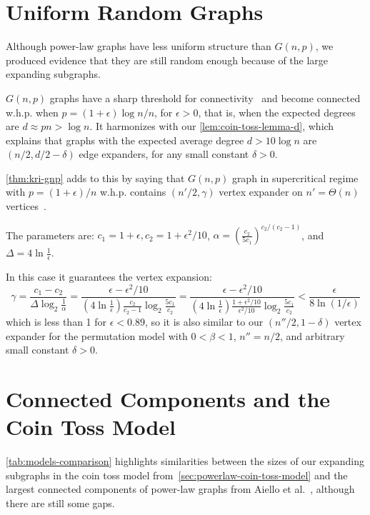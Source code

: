 \section{Uniform Random Graphs}

Although power-law graphs have less uniform structure than $G(n,p)$,
we produced evidence that they are still random enough because of
the large expanding subgraphs.

$G(n,p)$ graphs have a sharp threshold for connectivity~\cite{er59} and
become connected w.h.p. when $p=(1+\epsilon)\log n/n$, for $\epsilon>0$,
that is, when the expected degrees are $d\approx pn>\log n$.
It harmonizes with our \autoref{lem:coin-toss-lemma-d}, which explains
that graphs with the expected average degree $d>10\log n$
are $(n/2,d/2-\delta)$ edge expanders, for any small constant $\delta>0$.

\autoref{thm:kri-gnp} adds to this by saying that $G(n,p)$ graph
in supercritical regime with $p=(1+\epsilon)/n$ w.h.p. contains
$(n'/2,\gamma)$ vertex expander on $n'=\Theta(n)$ vertices~\cite{kri17}.

The parameters are:
$c_1=1+\epsilon,c_2=1+\epsilon^2/10$,
$\alpha=\left(\frac{c_2}{5c_1}\right)^{c_2/(c_2-1)}$,
and $\Delta=4\ln\frac{1}{\epsilon}$.

In this case it guarantees the vertex expansion:
\begin{equation}
    \gamma=\frac{c_1-c_2}{\Delta\log_2{\frac{1}{\alpha}}}
    =\frac{\epsilon-\epsilon^2/10}{
        \left(4\ln\frac{1}{\epsilon}\right)
        \frac{c_2}{c_2-1}
        \log_2{\frac{5c_1}{c_2}}
    }
    =\frac{\epsilon-\epsilon^2/10}{
        \left(4\ln\frac{1}{\epsilon}\right)
        \frac{1+\epsilon^2/10}{\epsilon^2/10}
        \log_2{\frac{5c_1}{c_2}}
    }
    <\frac{\epsilon}{8\ln(1/\epsilon)}
\end{equation}
which is less than 1 for $\epsilon<0.89$, so it is also similar to
our $(n''/2,1-\delta)$ vertex expander for the permutation model
with $0<\beta<1$, $n''=n/2$, and arbitrary small constant $\delta>0$.

\section{Connected Components and the Coin Toss Model}

\autoref{tab:models-comparison} highlights similarities between the sizes of our
expanding subgraphs in the coin toss model from~\autoref{sec:powerlaw-coin-toss-model}
and the largest connected components of power-law graphs from Aiello et al.~\cite{acl01},
although there are still some gaps.

